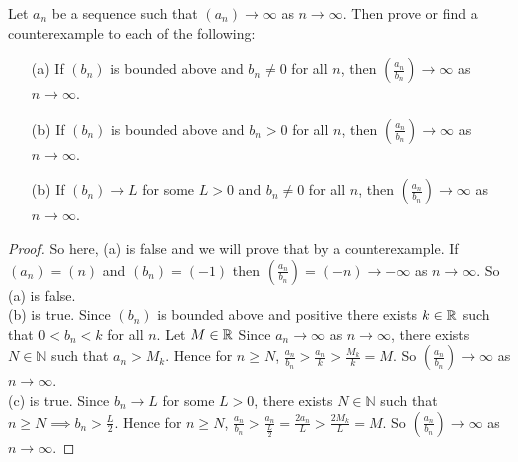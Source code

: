 \documentclass[11pt]{article}
\begin{document}
\begin{example}
	Let \(a_n\) be a sequence such that \((a_n) \to \infty\) as \( n \to \infty\). Then prove or find a counterexample to each of the following:
	\begin{itemize}
		\item[(a)] If \((b_n)\) is bounded above and \(b_n \neq 0\) for all \(n\), then \((\frac{a_n}{b_n}) \to \infty\) as \(n \to \infty\).
		\item[(b)] If \((b_n)\) is bounded above and \(b_n > 0\) for all \(n\), then \((\frac{a_n}{b_n}) \to \infty\) as \(n \to \infty\).
		\item[(b)] If \((b_n) \to L\) for some \(L > 0\) and  \(b_n \neq 0\) for all \(n\), then \((\frac{a_n}{b_n}) \to \infty\) as \(n \to \infty\).
	\end{itemize}
\end{example}
\begin{proof}
	So here, (a) is false and we will prove that by a counterexample.
	If \((a_n) = (n)\) and \((b_n) = (-1)\) then \((\frac{a_n}{b_n}) = (-n) \to -\infty\) as \(n \to \infty\). So (a) is false.\\
	(b) is true. Since \((b_n)\) is bounded above and positive there exists \(k \in \mathbb R\) such that \(0 < b_n < k\) for all \(n\). Let \(M \in \mathbb R\) Since \(a_n \to \infty\) as \(n \to \infty\), there exists \(N \in \mathbb{N}\) such that \(a_n > M_k\). Hence for \(n \geq N\), \(\frac{a_n}{b_n} > \frac{a_n}{k} > \frac{M_k}{k} = M\). So \((\frac{a_n}{b_n}) \to \infty\) as \(n \to \infty\).\\
	(c) is true. Since \(b_n \to L\) for some \(L > 0\), there exists \(N \in \mathbb{N}\) such that \(n \geq N \implies b_n > \frac{L}{2}\). Hence for \(n \geq N\), \(\frac{a_n}{b_n} > \frac{a_n}{\frac{L}{2}} = \frac{2a_n}{L} > \frac{2M_k}{L} = M\). So \((\frac{a_n}{b_n}) \to \infty\) as \(n \to \infty\).
\end{proof}
\end{document}
